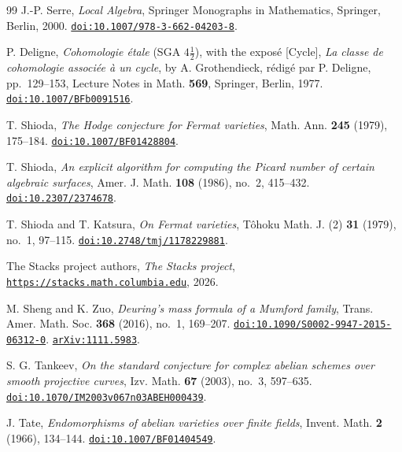 \begin{thebibliography}{99}
J.-P. Serre,
\emph{Local Algebra},
Springer Monographs in Mathematics,
Springer, Berlin, 2000.
\href{https://doi.org/10.1007/978-3-662-04203-8}{\texttt{doi:10.1007/978-3-662-04203-8}}.

P. Deligne,
\emph{Cohomologie \'etale} (SGA $4\frac{1}{2}$), with the expos\'e
[Cycle], \emph{La classe de cohomologie associ\'ee \`a un cycle}, by
A. Grothendieck, r\'edig\'e par P. Deligne, pp.~129--153,
Lecture Notes in Math. \textbf{569}, Springer, Berlin, 1977.
\href{https://doi.org/10.1007/BFb0091516}{\texttt{doi:10.1007/BFb0091516}}.

T. Shioda,
\emph{The Hodge conjecture for Fermat varieties},
Math. Ann. \textbf{245} (1979), 175--184.
\href{https://doi.org/10.1007/BF01428804}{\texttt{doi:10.1007/BF01428804}}.

T. Shioda,
\emph{An explicit algorithm for computing the Picard number of certain
algebraic surfaces},
Amer. J. Math. \textbf{108} (1986), no.~2, 415--432.
\href{https://doi.org/10.2307/2374678}{\texttt{doi:10.2307/2374678}}.

T. Shioda and T. Katsura,
\emph{On Fermat varieties},
T\^ohoku Math. J. (2) \textbf{31} (1979), no.~1, 97--115.
\href{https://doi.org/10.2748/tmj/1178229881}{\texttt{doi:10.2748/tmj/1178229881}}.

The Stacks project authors,
\emph{The Stacks project},
\href{https://stacks.math.columbia.edu}{\texttt{https://stacks.math.columbia.edu}},
2026.

M. Sheng and K. Zuo,
\emph{Deuring's mass formula of a Mumford family},
Trans. Amer. Math. Soc. \textbf{368} (2016), no.~1, 169--207.
\href{https://doi.org/10.1090/S0002-9947-2015-06312-0}%
{\texttt{doi:10.1090/S0002-9947-2015-06312-0}}.
\href{https://arxiv.org/abs/1111.5983}{\texttt{arXiv:1111.5983}}.

S. G. Tankeev,
\emph{On the standard conjecture for complex abelian schemes over smooth
projective curves},
Izv. Math. \textbf{67} (2003), no.~3, 597--635.
\href{https://doi.org/10.1070/IM2003v067n03ABEH000439}{\texttt{doi:10.1070/IM2003v067n03ABEH000439}}.

J. Tate,
\emph{Endomorphisms of abelian varieties over finite fields},
Invent. Math. \textbf{2} (1966), 134--144.
\href{https://doi.org/10.1007/BF01404549}{\texttt{doi:10.1007/BF01404549}}.


\end{thebibliography}
